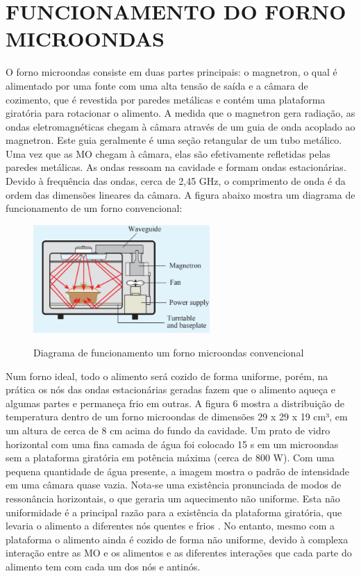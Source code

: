 \section{FUNCIONAMENTO DO FORNO MICROONDAS}
\label{sec:funcMicro}

O forno microondas consiste em duas partes principais: o magnetron, o qual é alimentado por uma fonte com uma alta tensão de saída e a câmara de cozimento, que é revestida por paredes metálicas e contém uma plataforma giratória para rotacionar o alimento. A medida que o magnetron gera radiação, as ondas eletromagnéticas chegam à câmara através de um guia de onda acoplado ao magnetron. Este guia geralmente é uma seção retangular de um tubo metálico. Uma vez que as MO chegam à câmara, elas são efetivamente refletidas pelas paredes metálicas. As ondas ressoam na cavidade e formam ondas estacionárias. Devido à frequência das ondas, cerca de 2,45 GHz, o comprimento de onda é da ordem das dimensões lineares da câmara. A figura abaixo mostra um diagrama de funcionamento de um forno convencional:

\begin{figure}[!htb]
    \centering
    \caption{Diagrama de funcionamento um forno microondas convencional}
    \includegraphics[width=0.6\textwidth]{./dados/figuras/microwave}
    \label{fig:figura-fontferro}
\end{figure}

Num forno ideal, todo o alimento será cozido de forma uniforme, porém, na prática os nós das ondas estacionárias geradas fazem que o alimento aqueça e algumas partes e permaneça frio em outras. A figura 6 mostra a distribuição de temperatura dentro de um forno microondas de dimensões  29 x 29 x 19 cm³, em um altura de cerca de 8 cm acima do fundo da cavidade. Um prato de vidro horizontal  com uma fina camada de água foi colocado 15 s em um microondas sem a plataforma giratória em potência máxima (cerca de 800 W). Com uma pequena quantidade de água presente, a imagem mostra o padrão de intensidade em uma câmara quase vazia. Nota-se uma existência pronunciada de modos de ressonância horizontais, o que geraria um aquecimento não uniforme. Esta não uniformidade é a principal razão para a existência da plataforma giratória, que levaria o alimento a diferentes nós quentes e frios \cite{Vollmer}. No entanto, mesmo com a plataforma o alimento ainda é cozido de forma não uniforme, devido à complexa interação entre as MO e os alimentos e as diferentes interações que cada parte do alimento tem com cada um dos nós e antinós.

